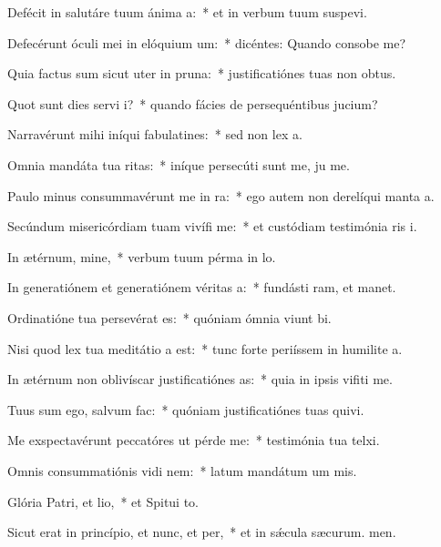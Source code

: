 \item Defécit in salutáre tuum ánima a:~* et in verbum tuum suspevi.
\item Defecérunt óculi mei in elóquium um:~* dicéntes: Quando consobe me?
\item Quia factus sum sicut uter in pruna:~* justificatiónes tuas non  obtus.
\item Quot sunt dies servi i?~* quando fácies de persequéntibus  jucium?
\item Narravérunt mihi iníqui fabulatines:~* sed non  lex a.
\item Omnia mandáta tua ritas:~* iníque persecúti sunt me, ju me.
\item Paulo minus consummavérunt me in ra:~* ego autem non derelíqui manta a.
\item Secúndum misericórdiam tuam vivífi me:~* et custódiam testimónia ris i.
\item In ætérnum, mine,~* verbum tuum pérma in lo.
\item In generatiónem et generatiónem véritas a:~* fundásti ram, et manet.
\item Ordinatióne tua persevérat es:~* quóniam ómnia viunt bi.
\item Nisi quod lex tua meditátio a est:~* tunc forte periíssem in humilite a.
\item In ætérnum non oblivíscar justificatiónes as:~* quia in ipsis vifiti me.
\item Tuus sum ego, salvum  fac:~* quóniam justificatiónes tuas quivi.
\item Me exspectavérunt peccatóres ut pérde me:~* testimónia tua telxi.
\item Omnis consummatiónis vidi nem:~* latum mandátum um mis.
\item Glória Patri, et lio,~* et Spitui to.
\item Sicut erat in princípio, et nunc, et per,~* et in sǽcula sæcurum. men.
